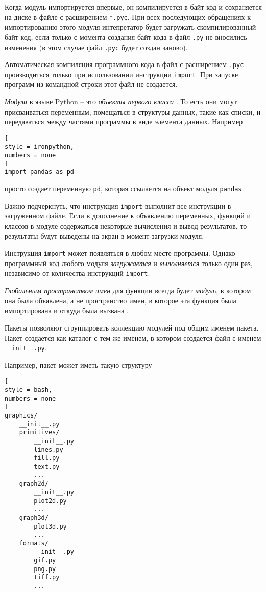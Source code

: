 \documentclass[%
	11pt,
	a4paper,
	utf8,
		]{article}
\begin{document}
Когда модуль импортируется впервые, он компилируется в байт-код и сохраняется на диске в файле с расширением \texttt{*.pyc}. При всех последующих обращениях к импортированию этого модуля интепретатор будет загружать скомпилированный байт-код, если только с момента создания байт-кода в файл \texttt{.py} не вносились изменения (в этом случае файл \texttt{.pyc} будет создан заново).

Автоматическая компиляция программного кода в файл с расширением \texttt{.pyc} производиться только при использовании инструкции \texttt{import}. При запуске программ из командной строки этот файл не создается.

\emph{Модули} в языке Python -- это \emph{объекты первого класса} \cite[]{beazley:python-2010}. То есть они могут присваиваться переменным, помещаться в структуры данных, такие как списки, и передаваться между частями программы в виде элемента данных. Например
\begin{lstlisting}[
style = ironpython,
numbers = none	
]
import pandas as pd
\end{lstlisting}
просто создает переменную \texttt{pd}, которая ссылается на объект модуля \texttt{pandas}.

Важно подчеркнуть, что инструкция \texttt{import} выполнит все инструкции в загруженном файле. Если в дополнение к объявлению переменных, функций и классов в модуле содержаться некоторые вычисления и вывод результатов, то результаты будут выведены на экран в момент загрузки модуля.

Инструкция \texttt{import} может появляться в любом месте программы. Однако программный код любого модуля \emph{загружается} и \emph{выполняется} только один раз, независимо от количества инструкций \texttt{import}. 

\emph{Глобальным пространством имен} для функции всегда будет \emph{модуль}, в котором она была \underline{объявлена}, а не пространство имен, в которое эта функция была импортирована и откуда была вызвана \cite[]{beazley:python-2010}.

Пакеты позволяют сгруппировать коллекцию модулей под общим именем пакета. Пакет создается как каталог с тем же именем, в котором создается файл с именем \verb|__init__.py|.

Например, пакет может иметь такую структуру
\begin{lstlisting}[
style = bash,
numbers = none
]
graphics/
    __init__.py
    primitives/
        __init__.py
        lines.py
        fill.py
        text.py
        ...
    graph2d/
        __init__.py
        plot2d.py
        ...
    graph3d/
        plot3d.py
        ...
    formats/
        __init__.py
        gif.py
        png.py
        tiff.py
        ...
\end{lstlisting}
\end{document}
